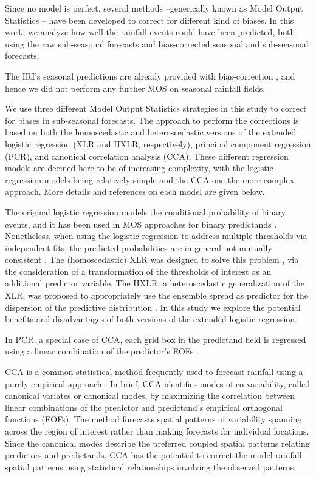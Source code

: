\documentclass{ametsoc}
\begin{document}
Since no model is perfect, several methods --generically known as Model Output Statistics \citep[MOS;][]{Glahn:1972vt} -- have been developed to correct for different kind of biases.
In this work, we analyze how well the rainfall events could have been predicted, both using the raw sub-seasonal forecasts and bias-corrected seasonal and sub-seasonal forecasts.

The IRI's seasonal predictions are already provided with bias-correction \citep{Barnston:2010ge}, and hence we did not perform any further MOS on seasonal rainfall fields.

We use three different Model Output Statistics strategies in this study to correct for biases in sub-seasonal forecasts.
The approach to perform the corrections is based on both the homoscedastic and heteroscedastic versions of the extended logistic regression (XLR and HXLR, respectively), principal component regression (PCR), and canonical correlation analysis (CCA).
These different regression models are deemed here to be of increasing complexity, with the logistic regression models being relatively simple and the CCA one the more complex approach. More details and references on each model are given below.

The original logistic regression models the conditional probability of binary events, and it has been used in MOS approaches for binary predictands \citep{Hamill:2004hk}.
Nonetheless, when using the logistic regression to address multiple thresholds via independent fits, the predicted probabilities are in general not mutually consistent \citep{Messner:2014gp}.
The (homoscedastic) XLR was designed to solve this problem \citep{Wilks:2009bk}, via the consideration of a transformation of the thresholds of interest as an additional predictor variable.
The HXLR, a heteroscedastic generalization of the XLR, was proposed to appropriately use the ensemble spread as predictor for the dispersion of the predictive distribution \citep{Messner:2014gp}.
In this study we explore the potential benefits and disadvantages of both versions of the extended logistic regression.

In PCR, a special case of CCA, each grid box in the predictand field is regressed using a linear combination of the predictor's EOFs \citep{Mason:2008da,Wilks:2006fx}.

CCA is a common statistical method frequently used to forecast rainfall using a purely empirical approach \citep{Mason:2008da,Barnston:2012ce}.
In brief, CCA \citep{Barnston:1992gd,Wilks:2006fx} identifies modes of co-variability, called canonical variates or canonical modes, by maximizing the correlation between linear combinations of the predictor and predictand's empirical orthogonal functions (EOFs).
The method forecasts spatial patterns of variability spanning across the region of interest rather than making forecasts for individual locations.
Since the canonical modes describe the preferred coupled spatial patterns relating predictors and predictands, CCA has the potential to correct the model rainfall spatial patterns using statistical relationships involving the observed patterns.
\end{document}
